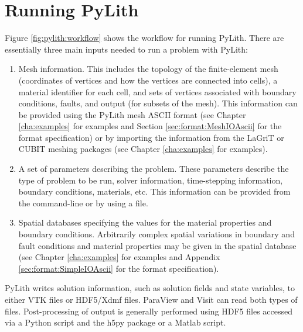 
\chapter{Running PyLith}

Figure \vref{fig:pylith:workflow} shows the workflow for running PyLith.
There are essentially three main inputs needed to run a problem with
PyLith:
\begin{enumerate}
\item Mesh information. This includes the topology of the
  finite-element mesh (coordinates of vertices and how the vertices
  are connected into cells), a material identifier for each cell, and
  sets of vertices associated with boundary conditions, faults, and
  output (for subsets of the mesh). This information can be provided
  using the PyLith mesh ASCII format (see Chapter \vref{cha:examples}
  for examples and Section \vref{sec:format:MeshIOAscii} for the format
  specification) or by importing the information from the LaGriT or
  CUBIT meshing packages (see Chapter \vref{cha:examples} for
  examples).
\item A set of parameters describing the problem. These parameters
  describe the type of problem to be run, solver information,
  time-stepping information, boundary conditions, materials, etc. This
  information can be provided from the command-line or by using a
   file.
\item Spatial databases specifying the values for the material
  properties and boundary conditions. Arbitrarily complex spatial
  variations in boundary and fault conditions and material properties
  may be given in the spatial database (see Chapter
  \vref{cha:examples} for examples and Appendix
  \vref{sec:format:SimpleIOAscii} for the format specification).
\end{enumerate}
PyLith writes solution information, such as solution fields and state
variables, to either VTK files or HDF5/Xdmf files. ParaView and Visit
can read both types of files. Post-processing of output is generally
performed using HDF5 files accessed via a Python script and the h5py
package or a Matlab script.

